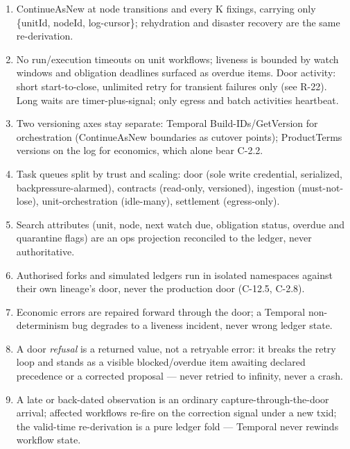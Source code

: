 \documentclass[11pt,a4paper]{article}
\begin{document}
\begin{enumerate}[label=\textbf{R-\arabic*.}, leftmargin=*, itemsep=1pt]
  (signal-with-start, no parent--child coupling); graph branches stay in the owning
  unit's workflow; corporate-action cascades fan out as signals to existing units, each
  firing proposing its own txid. \emph{Round-3 note: TE-2's dispute withdrawn on the
  certified partial-edge text --- the split legs are genuinely new units.}
\item ContinueAsNew at node transitions and every K fixings, carrying only
  \{unitId, nodeId, log-cursor\}; rehydration and disaster recovery are the same
  re-derivation.
\item No run/execution timeouts on unit workflows; liveness is bounded by watch windows
  and obligation deadlines surfaced as overdue items. Door activity: short
  start-to-close, unlimited retry for transient failures only (see R-22). Long waits are
  timer-plus-signal; only egress and batch activities heartbeat.
\item Two versioning axes stay separate: Temporal Build-IDs/GetVersion for
  orchestration (ContinueAsNew boundaries as cutover points); ProductTerms versions on
  the log for economics, which alone bear C-2.2.
\item Task queues split by trust and scaling: door (sole write credential, serialized,
  backpressure-alarmed), contracts (read-only, versioned), ingestion (must-not-lose),
  unit-orchestration (idle-many), settlement (egress-only).
\item Search attributes (unit, node, next watch due, obligation status, overdue and
  quarantine flags) are an ops projection reconciled to the ledger, never authoritative.
\item Authorised forks and simulated ledgers run in isolated namespaces against their
  own lineage's door, never the production door (C-12.5, C-2.8).
\item Economic errors are repaired forward through the door; a Temporal
  non-determinism bug degrades to a liveness incident, never wrong ledger state.
\item A door \emph{refusal} is a returned value, not a retryable error: it breaks the
  retry loop and stands as a visible blocked/overdue item awaiting declared precedence
  or a corrected proposal --- never retried to infinity, never a crash.
\item A late or back-dated observation is an ordinary capture-through-the-door arrival;
  affected workflows re-fire on the correction signal under a new txid; the valid-time
  re-derivation is a pure ledger fold --- Temporal never rewinds workflow state.

\end{enumerate}
\end{document}

